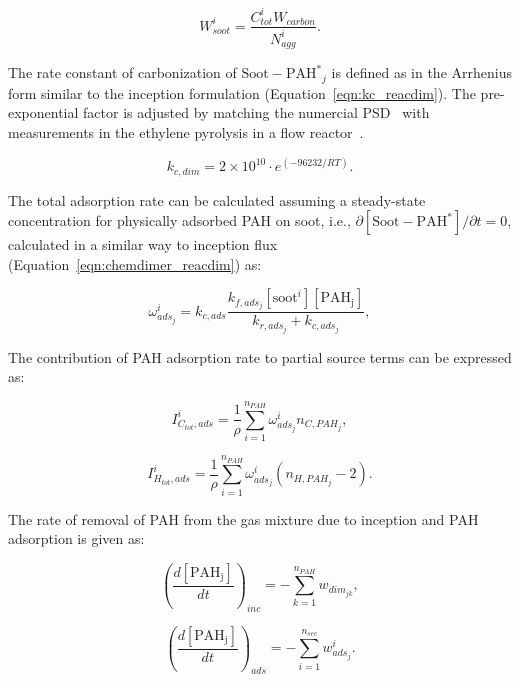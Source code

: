 \begin{equation}
	W^i_{soot}=\frac{C^i_{tot}W_{carbon}}{N^i_{agg}}.
\end{equation}

The rate constant of carbonization of $\mathrm{Soot-PAH^*}_j$ is defined as in the Arrhenius form similar to the inception formulation (Equation~\eqref{eqn:kc_reacdim}). The pre-exponential factor is adjusted by matching the numercial PSD~\citep{naseri2022simulating} with measurements in the ethylene pyrolysis in a flow reactor~\cite{araki2021effects}. 

\begin{equation}
	k_{c,dim} = 2\times10^{10}\cdot e^{(-96232/RT)}
	\label{eqn:kcads_reacdim}.
\end{equation}


The total adsorption rate can be calculated assuming a steady-state concentration for physically adsorbed PAH on soot, i.e., ${\partial{[\mathrm{Soot-PAH^*}]}/\partial t = 0}$, calculated in a similar way to inception flux (Equation~\eqref{eqn:chemdimer_reacdim}) as:

\begin{equation}
	\omega^i_{ads_j} = k_{c,ads}\frac{k_{f,ads_j}[\mathrm{soot}^i][\mathrm{PAH_j}]}{k_{r,ads_j}+k_{c,ads_j}}
	\label{eqn:wads_reacdim},
\end{equation}

The contribution of PAH adsorption rate to partial source terms can be expressed as:

\begin{equation}
	I^i_{C_{tot},ads} =
	\frac{1}{\rho}
	\sum_{i=1}^{n_{PAH}}
	\omega^i_{ads_j}
	n_{C,PAH_j}
	\label{eqn:ICtotads_reacdim},
\end{equation}

\begin{equation}
	I^i_{H_{tot},ads} =
	\frac{1}{\rho}
	\sum_{i=1}^{n_{PAH}}
	\omega^i_{ads_j}
	\left(n_{H,PAH_j}-2\right)
	\label{eqn:IHtotads_reacdim}.
\end{equation}

The rate of removal of PAH from the gas mixture due to inception and PAH adsorption is given as:

\begin{equation}
	\left(
	\frac{d\left[{\mathrm{PAH_j}}\right]}{dt}
	\right)_{inc}
	= 
	-\sum_{k=1}^{n_{PAH}}w_{dim_{jk}},
	\label{eqn:PAHscrub_inc_reacdim}
\end{equation}

\begin{equation}
	\left(
	\frac{d\left[{\mathrm{PAH_j}}\right]}{dt}
	\right)_{ads}
	= -\sum_{i=1}^{n_{sec}}w^i_{ads_j}.
	\label{eqn:PAHscrub_ads_reacdim}
\end{equation}

